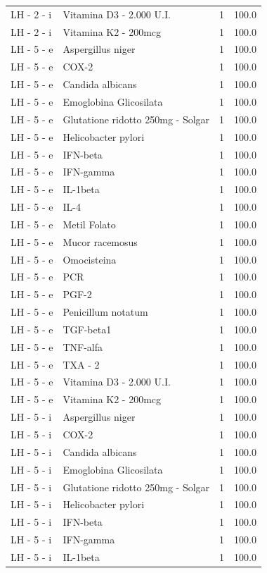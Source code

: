\documentclass[a4paper,11pt]{article}
\begin{document}
\begin{footnotesize}
\begin{longtable}{p{3.5cm}p{7.5cm}rr}
LH - 2 - i & Vitamina D3 - 2.000 U.I. & 1 & 100.0 \\
LH - 2 - i & Vitamina K2 - 200mcg & 1 & 100.0 \\
LH - 5 - e & Aspergillus niger & 1 & 100.0 \\
LH - 5 - e & COX-2 & 1 & 100.0 \\
LH - 5 - e & Candida albicans & 1 & 100.0 \\
LH - 5 - e & Emoglobina Glicosilata & 1 & 100.0 \\
LH - 5 - e & Glutatione ridotto 250mg - Solgar & 1 & 100.0 \\
LH - 5 - e & Helicobacter pylori & 1 & 100.0 \\
LH - 5 - e & IFN-beta & 1 & 100.0 \\
LH - 5 - e & IFN-gamma & 1 & 100.0 \\
LH - 5 - e & IL-1beta & 1 & 100.0 \\
LH - 5 - e & IL-4 & 1 & 100.0 \\
LH - 5 - e & Metil Folato & 1 & 100.0 \\
LH - 5 - e & Mucor racemosus & 1 & 100.0 \\
LH - 5 - e & Omocisteina & 1 & 100.0 \\
LH - 5 - e & PCR & 1 & 100.0 \\
LH - 5 - e & PGF-2 & 1 & 100.0 \\
LH - 5 - e & Penicillum notatum & 1 & 100.0 \\
LH - 5 - e & TGF-beta1 & 1 & 100.0 \\
LH - 5 - e & TNF-alfa & 1 & 100.0 \\
LH - 5 - e & TXA - 2 & 1 & 100.0 \\
LH - 5 - e & Vitamina D3 - 2.000 U.I. & 1 & 100.0 \\
LH - 5 - e & Vitamina K2 - 200mcg & 1 & 100.0 \\
LH - 5 - i & Aspergillus niger & 1 & 100.0 \\
LH - 5 - i & COX-2 & 1 & 100.0 \\
LH - 5 - i & Candida albicans & 1 & 100.0 \\
LH - 5 - i & Emoglobina Glicosilata & 1 & 100.0 \\
LH - 5 - i & Glutatione ridotto 250mg - Solgar & 1 & 100.0 \\
LH - 5 - i & Helicobacter pylori & 1 & 100.0 \\
LH - 5 - i & IFN-beta & 1 & 100.0 \\
LH - 5 - i & IFN-gamma & 1 & 100.0 \\
LH - 5 - i & IL-1beta & 1 & 100.0 \\

\end{longtable}
\end{footnotesize}
\end{document}
